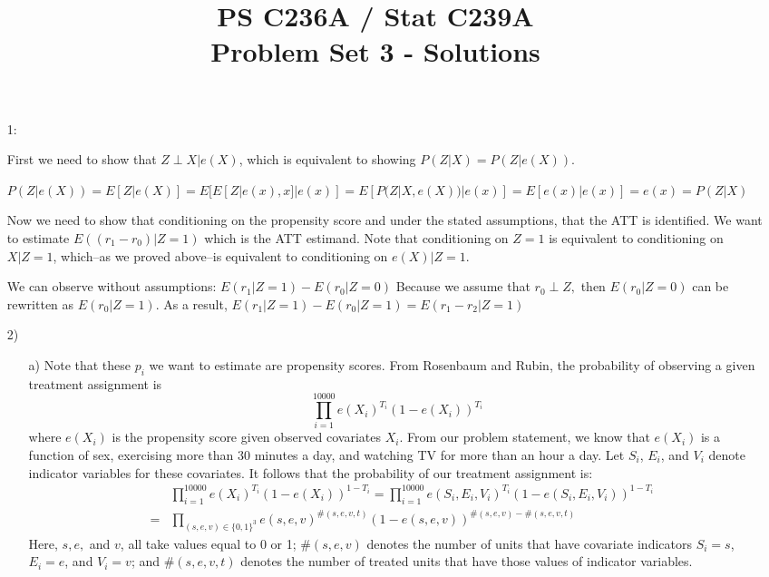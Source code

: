\documentclass{article}
\begin{document}
\title{PS C236A / Stat C239A \\ Problem Set 3 - Solutions}
\date{}
\maketitle

\begin{itemize}
\item[1:] 

First we need to show that $Z \perp X |e(X)$, which is equivalent to
showing $P(Z|X) = P(Z|e(X))$. 
\vspace{1em}

$P(Z|e(X)) = E[Z|e(X)] = E[E[Z|e(x),
x]|e(x)] = E[P(Z|X, e(X))|e(x)]= E[e(x)|e(x)] = e(x) = P(Z|X)$
\vspace{1em}

Now we need to show that conditioning on the propensity score and under the stated assumptions, that the ATT is identified.
We want to estimate $E((r_1-r_0)| Z =1)$  which is the ATT
estimand. Note that conditioning on $Z = 1$ is equivalent to
conditioning on $X|Z = 1$, which--as we proved above--is equivalent to
conditioning on $e(X)|Z = 1$. 
\vspace{1em}

We can observe without assumptions:
$E(r_1|Z=1)-E(r_0|Z=0)$
Because we assume that $r_0 \perp Z,$ then $E(r_0|Z = 0)$ can be rewritten as $E(r_0|Z = 1)$. As a result,
$E(r_1|Z =1)-E(r_0|Z =1)=E(r_1 -r_2|Z =1)$


  \item[2)]
    \begin{itemize}
    \item[a)]
      Note that these $p_i$ we want to estimate are
      propensity scores.
      From Rosenbaum and Rubin, 
      the probability of observing a given treatment assignment is
      $$
        \prod_{i=1}^{10000} e(X_i)^{T_i}(1-e(X_i))^{T_i}
      $$
      where $e(X_i)$ is the propensity score given observed covariates $X_i$.
      From our problem statement, we know that $e(X_i)$ is a function
      of sex, exercising more than 30 minutes a day, 
      and watching TV for more than an hour a day.
      Let $S_i$, $E_i$, and $V_i$ denote indicator variables for these covariates.
      It follows that the probability of our treatment assignment is:
      \begin{eqnarray}
        && \prod_{i=1}^{10000} e(X_i)^{T_i}(1-e(X_i))^{1-T_i} = 
        \prod_{i=1}^{10000} e(S_i,E_i,V_i)^{T_i}(1-e(S_i,E_i,V_i))^{1-T_i}\nonumber \\
        & = & \prod_{(s,e,v) \in \{0,1\}^3} e(s,e,v)^{\#(s,e,v,t)}
              (1-e(s,e,v))^{\#(s,e,v)- \#(s,e,v,t)} \label{eqnsome}
      \end{eqnarray}
      Here, $s,e,$ and $v$, all take values equal to 0 or 1;
       $\#(s,e,v)$ denotes the number of units that have covariate indicators
       $S_i = s$, $E_i = e$, and $V_i = v$; and
      $\#(s,e,v,t)$ denotes the number of treated units that have those values
      of indicator variables.
      

\end{itemize}
\end{itemize}
\end{document}
